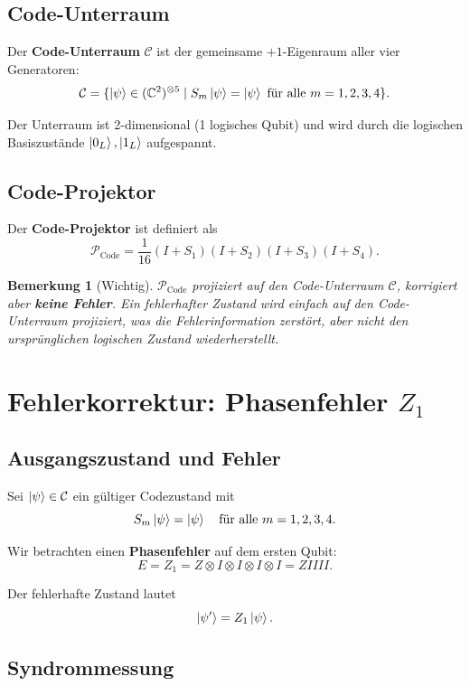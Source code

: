 \documentclass[11pt,a4paper]{article}
\newtheorem{remark}[theorem]{Bemerkung}
\begin{document}
\subsection{Code-Unterraum}

Der \textbf{Code-Unterraum} $\mathcal{C}$ ist der gemeinsame $+1$-Eigenraum aller vier Generatoren:
\[
\mathcal{C} = \{\ket{\psi} \in (\mathbb{C}^2)^{\otimes 5} \mid S_m \ket{\psi} = \ket{\psi} \text{ für alle } m = 1,2,3,4\}.
\]

Der Unterraum ist 2-dimensional (1 logisches Qubit) und wird durch die logischen Basiszustände $\ket{0_L}, \ket{1_L}$ aufgespannt.

\subsection{Code-Projektor}

Der \textbf{Code-Projektor} ist definiert als
\[
\mathcal{P}_{\text{Code}} = \frac{1}{16} (I + S_1)(I + S_2)(I + S_3)(I + S_4).
\]

\begin{remark}[Wichtig]
$\mathcal{P}_{\text{Code}}$ projiziert auf den Code-Unterraum $\mathcal{C}$, korrigiert aber \textbf{keine Fehler}. Ein fehlerhafter Zustand wird einfach auf den Code-Unterraum projiziert, was die Fehlerinformation zerstört, aber nicht den ursprünglichen logischen Zustand wiederherstellt.
\end{remark}

\section{Fehlerkorrektur: Phasenfehler $Z_1$}

\subsection{Ausgangszustand und Fehler}

Sei $\ket{\psi} \in \mathcal{C}$ ein gültiger Codezustand mit
\[
S_m \ket{\psi} = \ket{\psi} \quad \text{für alle } m = 1,2,3,4.
\]

Wir betrachten einen \textbf{Phasenfehler} auf dem ersten Qubit:
\[
E = Z_1 = Z \otimes I \otimes I \otimes I \otimes I = ZIIII.
\]

Der fehlerhafte Zustand lautet
\[
\ket{\psi'} = Z_1 \ket{\psi}.
\]

\subsection{Syndrommessung}
\end{document}
